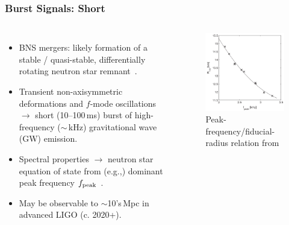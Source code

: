 \documentclass[serif,mathserif,10pt]{beamer}
\let\oldframetitle\frametitle%
\renewcommand{\frametitle}[1]{%
      \oldframetitle{#1}\setstretch{1.2}}
\def\gw#1{gravitational wave#1 (GW#1)\gdef\gw{GW}}
\begin{document}
\begin{frame}
    \frametitle{Burst Signals: Short}

    \begin{columns}


        {\small 
        \begin{itemize}
            \item BNS mergers: likely formation of a stable / quasi-stable,
                differentially rotating neutron star
                remnant~\cite{shibata:06bns, giacomazzo:11, hotokezaka:11,
                bauswein:12}.
            \item Transient non-axisymmetric deformations and $f$-mode oscillations
                $\rightarrow$ short (10--100\,ms) burst of high-frequency ($\sim $\,kHz)
                \gw{} emission.
            \item Spectral properties $\rightarrow$ neutron star equation of
                state from (e.g.,) dominant peak frequency $f_{\rm
                peak}$~\cite{hotokezaka:13,bauswein:14}.
            \item May be observable to $\sim$10's\,Mpc in advanced LIGO (c.
                2020+).
        \end{itemize}
    }


        \begin{center}
            \vspace{-0.1cm}
            \begin{figure}
                \includegraphics[width=1\columnwidth]{figures/fpeakR16.png}
                \caption{Peak-frequency/fiducial-radius relation
                from~\cite{bauswein:14}}
            \end{figure}
        \end{center}


\end{columns}
\end{frame}
\end{document}
